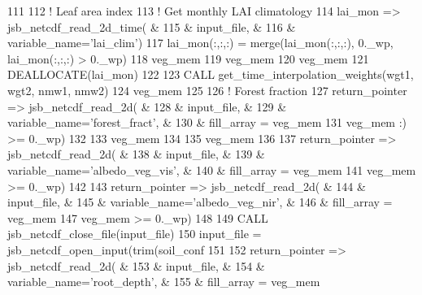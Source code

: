 \begin{DoxyCode}
111 
112     \textcolor{comment}{! Leaf area index}
113     \textcolor{comment}{! Get monthly LAI climatology}
114     lai\_mon => jsb\_netcdf\_read\_2d\_time(    &
115       & input\_file,                        &
116       & variable\_name=\textcolor{stringliteral}{'lai\_clim'})
117     lai\_mon(:,:,:) = merge(lai\_mon(:,:,:), 0.\_wp, lai\_mon(:,:,:) > 0.\_wp)
118     veg\_mem%
119     veg\_mem%
120     veg\_mem%
121     \textcolor{keyword}{DEALLOCATE}(lai\_mon)
122 
123     \textcolor{keyword}{CALL }get\_time\_interpolation\_weights(wgt1, wgt2, nmw1, nmw2)
124     veg\_mem%
125 
126     \textcolor{comment}{! Forest fraction}
127     return\_pointer => jsb\_netcdf\_read\_2d(        &
128       & input\_file,                              &
129       & variable\_name=\textcolor{stringliteral}{'forest\_fract'},            &
130       & fill\_array = veg\_mem%
131     veg\_mem%
      :) >= 0.\_wp)
132 
133     veg\_mem%
134 
135     veg\_mem%
136 
137     return\_pointer => jsb\_netcdf\_read\_2d(         &
138       & input\_file,                               &
139       & variable\_name=\textcolor{stringliteral}{'albedo\_veg\_vis'},           &
140       & fill\_array = veg\_mem%
141     veg\_mem%
      >= 0.\_wp)
142 
143     return\_pointer => jsb\_netcdf\_read\_2d(         &
144       & input\_file,                               &
145       & variable\_name=\textcolor{stringliteral}{'albedo\_veg\_nir'},           &
146       & fill\_array = veg\_mem%
147     veg\_mem%
      >= 0.\_wp)
148 
149     \textcolor{keyword}{CALL }jsb\_netcdf\_close\_file(input\_file)
150     input\_file = jsb\_netcdf\_open\_input(trim(soil\_conf%
151 
152     return\_pointer => jsb\_netcdf\_read\_2d(         &
153       & input\_file,                               &
154       & variable\_name=\textcolor{stringliteral}{'root\_depth'},               &
155       & fill\_array = veg\_mem%

\end{DoxyCode}
